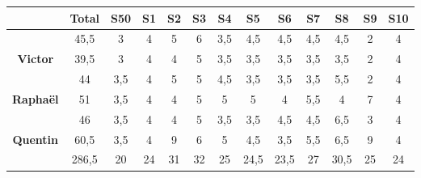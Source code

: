 \def\colorrow{\rowcolor[gray]{0.8}}
\begin{longtable}{|c|c|c|c|c|c|c|c|c|c|c|c|c|}
\hline
&{\bf Total}&{\bf S50}&{\bf S1}&{\bf S2}&{\bf S3}&{\bf S4}&{\bf S5}&{\bf S6}&{\bf S7}&{\bf S8}&{\bf S9}&{\bf S10}\\
\hline
\endhead
\colorrow {\bf Karen}&45,5&3&4&5&6&3,5&4,5&4,5&4,5&4,5&2&4\\
\hline
{\bf Victor}&39,5&3&4&4&5&3,5&3,5&3,5&3,5&3,5&2&4\\
\hline
\colorrow {\bf Clément}&44&3,5&4&5&5&4,5&3,5&3,5&3,5&5,5&2&4\\
\hline
{\bf Raphaël}&51&3,5&4&4&5&5&5&4&5,5&4&7&4\\
\hline
\colorrow {\bf Hugo}&46&3,5&4&4&5&3,5&3,5&4,5&4,5&6,5&3&4\\
\hline
{\bf Quentin}&60,5&3,5&4&9&6&5&4,5&3,5&5,5&6,5&9&4\\
\hline
\hline
\colorrow {\bf Total}&286,5&20&24&31&32&25&24,5&23,5&27&30,5&25&24\\
\hline
\end{longtable}
